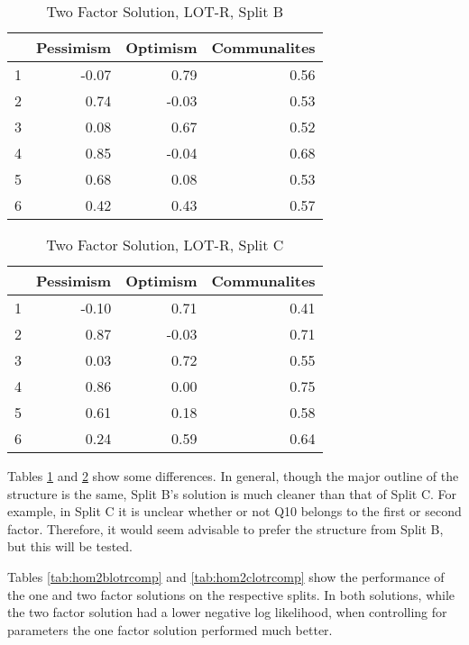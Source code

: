 \documentclass{article}
\begin{document}
\begin{table}[ht]
\centering
\begin{tabular}{rrrr}
  \hline
 & Pessimism & Optimism & Communalites \\ 
  \hline
1 & -0.07 & 0.79 & 0.56 \\ 
  2 & 0.74 & -0.03 & 0.53 \\ 
  3 & 0.08 & 0.67 & 0.52 \\ 
  4 & 0.85 & -0.04 & 0.68 \\ 
  5 & 0.68 & 0.08 & 0.53 \\ 
  6 & 0.42 & 0.43 & 0.57 \\ 
   \hline
\end{tabular}
\caption{Two Factor Solution, LOT-R, Split B} 
\label{tab:hom2blotr2}
\end{table}
\begin{table}[ht]
\centering
\begin{tabular}{rrrr}
  \hline
 & Pessimism & Optimism & Communalites \\ 
  \hline
1 & -0.10 & 0.71 & 0.41 \\ 
  2 & 0.87 & -0.03 & 0.71 \\ 
  3 & 0.03 & 0.72 & 0.55 \\ 
  4 & 0.86 & 0.00 & 0.75 \\ 
  5 & 0.61 & 0.18 & 0.58 \\ 
  6 & 0.24 & 0.59 & 0.64 \\ 
   \hline
\end{tabular}
\caption{Two Factor Solution, LOT-R, Split C} 
\label{tab:hom2clotr2}
\end{table}
Tables \ref{tab:hom2blotr2} and \ref{tab:hom2clotr2} show some differences. In general, though the major outline of the structure is the same, Split B's solution is much cleaner than that of Split C. For example, in Split C it is unclear whether or not Q10 belongs to the first or second factor. Therefore, it would seem advisable to prefer the structure from Split B, but this will be tested. 









Tables \ref{tab:hom2blotrcomp} and \ref{tab:hom2clotrcomp} show the performance of the one and two factor solutions on the respective splits. In both solutions, while the two factor solution had a lower negative log likelihood, when controlling for parameters the one factor solution performed much better. 
\end{document}
